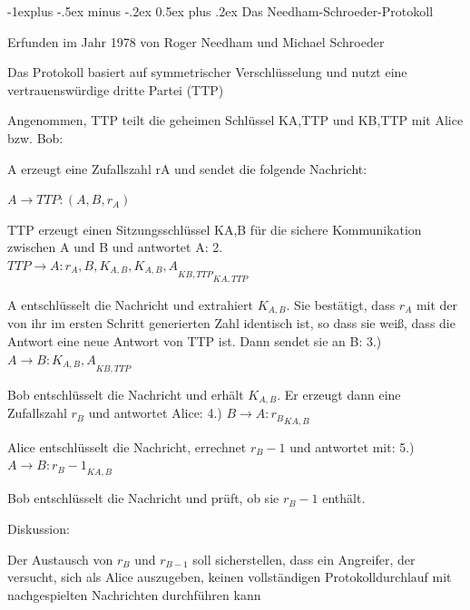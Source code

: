 \documentclass[a4paper]{article}
\makeatletter
\renewcommand{\subsection}{\@startsection{subsection}{2}{0mm}%
 {-1explus -.5ex minus -.2ex}%
 {0.5ex plus .2ex}%
 {\normalfont\normalsize\bfseries}}
\makeatother
\begin{document}
\begin{multicols}{3}
      \subsection{Das Needham-Schroeder-Protokoll}
      \begin{itemize*}
            \item Erfunden im Jahr 1978 von Roger Needham und Michael Schroeder
            \item Das Protokoll basiert auf symmetrischer Verschlüsselung und nutzt eine vertrauenswürdige dritte Partei (TTP)
            \item Angenommen, TTP teilt die geheimen Schlüssel KA,TTP und KB,TTP mit Alice bzw. Bob:
            \begin{itemize*}
                  \item A erzeugt eine Zufallszahl rA und sendet die folgende Nachricht:
                  \begin{enumerate*}
                        \item $A\rightarrow TTP: (A, B, r_A)$
                  \end{enumerate*}
                  \item TTP erzeugt einen Sitzungsschlüssel KA,B für die sichere Kommunikation zwischen A und B und antwortet A: 2. $TTP\rightarrow A:{r_A, B, K_{A,B}, {K_{A,B}, A}_{{K}{B,TTP}}}_{{K}{A,TTP}}$
                  \item A entschlüsselt die Nachricht und extrahiert $K_{A,B}$. Sie bestätigt, dass $r_A$ mit der von ihr im ersten Schritt generierten Zahl identisch ist, so dass sie weiß, dass die Antwort eine neue Antwort von TTP ist. Dann sendet sie an B: 3.) $A\rightarrow B:{K_{A,B}, A}_{{K}{B,TTP}}$
                  \item Bob entschlüsselt die Nachricht und erhält $K_{A,B}$. Er erzeugt dann eine Zufallszahl $r_B$ und antwortet Alice: 4.) $B\rightarrow A:{r_B}_{{K}{A,B}}$
                  \item Alice entschlüsselt die Nachricht, errechnet $r_{B}-1$ und antwortet mit: 5.) $A\rightarrow B:{r_B-1}_{{K}{A,B}}$
                  \item Bob entschlüsselt die Nachricht und prüft, ob sie $r_B-1$ enthält.
            \end{itemize*}
            \item Diskussion:
            \begin{itemize*}
                  \item Der Austausch von $r_B$ und $r_{B-1}$ soll sicherstellen, dass ein Angreifer, der versucht, sich als Alice auszugeben, keinen vollständigen Protokolldurchlauf mit nachgespielten Nachrichten durchführen kann

\end{itemize*}
\end{itemize*}
\end{multicols}
\end{document}
